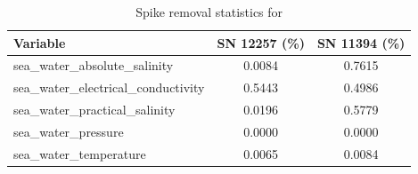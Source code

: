 \begin{table}[h]
\centering
\caption{Spike removal statistics for \projectname{} \casenumber{}}
\label{tab:spike_stats}
\begin{tabular}{|l|c|c|}
\hline
Variable & SN 12257 (\%) & SN 11394 (\%) \\
\hline
sea\_water\_absolute\_salinity & 0.0084 & 0.7615 \\
sea\_water\_electrical\_conductivity & 0.5443 & 0.4986 \\
sea\_water\_practical\_salinity & 0.0196 & 0.5779 \\
sea\_water\_pressure & 0.0000 & 0.0000 \\
sea\_water\_temperature & 0.0065 & 0.0084 \\
\hline
\end{tabular}
\end{table}

